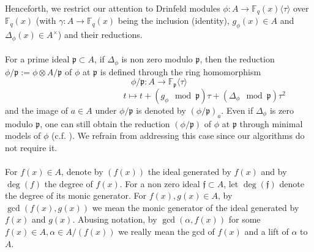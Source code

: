 \documentclass{article}
\theoremstyle{plain}
\theoremstyle{definition}
\def\F{\ensuremath{\mathbb{F}}}
\newcommand{\ph}{(\phi/\p)}
\newcommand{\p}{\mathfrak p}
\newcommand{\f}{\mathfrak f}
\begin{document}
Henceforth, we restrict our attention to Drinfeld modules $\phi:A \longrightarrow \F_q(x)\langle\tau\rangle$ over $\F_q(x)$ (with $\gamma : A \rightarrow \F_q(x)$ being the inclusion (identity), $g_\phi(x)\in A$ and $\Delta_\phi(x)\in A^\times$) and their reductions.\\ \\
For a prime ideal $\p \subset A$, if $\Delta_\phi$ is non zero modulo $\p$, then the reduction $\phi/\p := \phi \otimes A/\p$ of $\phi$ at $\p$ is defined through the ring homomorphism $$\phi/\p : A \longrightarrow \F_\p\langle \tau \rangle$$ $$\ \ \ \ \ \ \ \ \ \ \ \ \ \ \ \ \ \ \ \ \ \ \ \ \ \ \ \ \ \ \ \ \ \ \ \ \ \ \ \ \ \ \ \ \ \ \ \ t \longmapsto t + (g_\phi \mod \p) \tau + (\Delta_\phi\mod\p) \tau^2$$
and the image of $a \in A$ under $\phi/\p$ is denoted by $(\phi/\p)_a$. Even if $\Delta_{\phi}$ is zero modulo $\p$, one can still obtain the reduction $(\phi/\p)$ of $\phi$ at $\p$ through minimal models of $\phi$ (c.f. \cite{gek1}). We refrain from addressing this case since our algorithms do not require it.\\ \\
For $f(x) \in A$, denote by $(f(x))$ the ideal generated by $f(x)$ and by $\deg(f)$ the degree of 
$f(x)$. For a non zero ideal $\f \subset A$, let $\deg(\f)$ denote the degree of its monic 
generator. For $f(x),g(x) \in A$, by $\gcd(f(x),g(x))$ we mean the monic generator of the ideal 
generated by $f(x)$ and $g(x)$. Abusing notation, by $\gcd(\alpha,f(x))$ for some $f(x) \in A, 
\alpha \in A/(f(x))$ we really mean the gcd of $f(x)$ and a lift of $\alpha$ to $A$.
\end{document}
